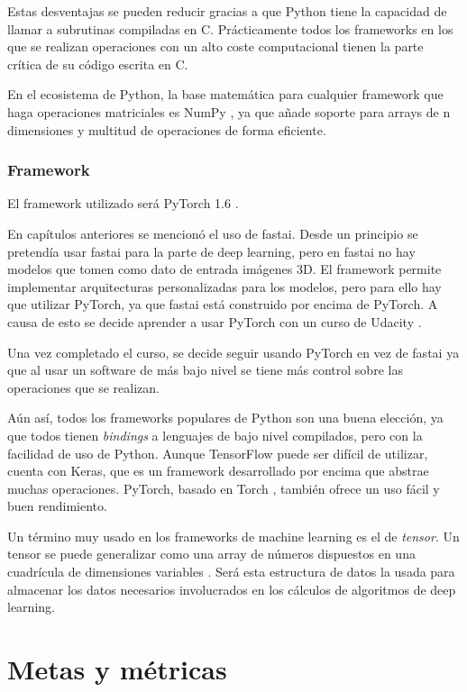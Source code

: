 Estas desventajas se pueden reducir gracias a que Python tiene la capacidad de llamar a subrutinas compiladas en C. Prácticamente todos los frameworks en los que se realizan operaciones con un alto coste computacional tienen la parte crítica de su código escrita en C.

En el ecosistema de Python, la base matemática para cualquier framework que haga operaciones matriciales es NumPy \cite{VanDerWalt2011}, ya que añade soporte para arrays de n dimensiones y multitud de operaciones de forma eficiente.

\subsubsection{Framework}\label{subsec:framework}

El framework utilizado será PyTorch 1.6 \cite{Paszke2019}.

En capítulos anteriores se mencionó el uso de fastai. Desde un principio se pretendía usar fastai para la parte de deep learning, pero en fastai no hay modelos que tomen como dato de entrada imágenes 3D. El framework permite implementar arquitecturas personalizadas para los modelos, pero para ello hay que utilizar PyTorch, ya que fastai está construido por encima de PyTorch. A causa de esto se decide aprender a usar PyTorch con un curso de Udacity \cite[Deep Learning with PyTorch]{Serrano2020}.

Una vez completado el curso, se decide seguir usando PyTorch en vez de fastai ya que al usar un software de más bajo nivel se tiene más control sobre las operaciones que se realizan.

Aún así, todos los frameworks populares de Python son una buena elección, ya que todos tienen \textit{bindings} a lenguajes de bajo nivel compilados, pero con la facilidad de uso de Python. Aunque TensorFlow puede ser difícil de utilizar, cuenta con Keras, que es un framework desarrollado por encima que abstrae muchas operaciones. PyTorch, basado en Torch \cite{Collobert2011}, también ofrece un uso fácil y buen rendimiento.

Un término muy usado en los frameworks de machine learning es el de \textit{tensor}. Un tensor se puede generalizar como una array de números dispuestos en una cuadrícula de dimensiones variables \cite[p. 31]{Goodfellow2016}. Será esta estructura de datos la usada para almacenar los datos necesarios involucrados en los cálculos de algoritmos de deep learning.

\section{Metas y m\'etricas}\label{sec:goals_and_metrics}

